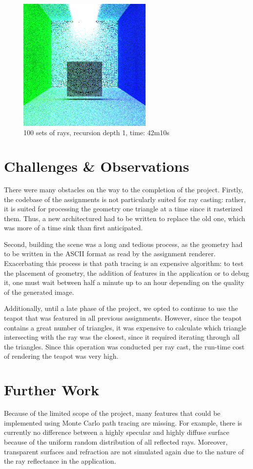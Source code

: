 \documentclass[12pt,journal]{IEEEtran}
\begin{document}
\begin{figure}[!t]

\centering
\includegraphics[width=2.6in]{100s_16d_42m10s}
\caption{100 sets of rays, recursion depth 1, time: 42m10s}
\label{1100s_16d_42m10s}

\end{figure}

\section{Challenges \& Observations}
There were many obstacles on the way to the completion of the project. Firstly, the codebase of the assignments is not particularly suited for ray casting: rather, it is suited for processing the geometry one triangle at a time since it rasterized them. Thus, a new architectured had to be written to replace the old one, which was more of a time sink than first anticipated. 
\par
Second, building the scene was a long and tedious process, as the geometry had to be written in the ASCII format as read by the assignment renderer. Exacerbating this process is that path tracing is an expensive algorithm: to test the placement of geometry, the addition of features in the application or to debug it, one must wait between half a minute up to an hour depending on the quality of the generated image.
\par
Additionally, until a late phase of the project, we opted to continue to use the teapot that was featured in all previous assignments. However, since the teapot contains a great number of triangles, it was  expensive to calculate which triangle intersecting with the ray was the closest, since it required iterating through all the triangles. Since this operation was conducted per ray cast, the run-time cost of rendering the teapot was very high.

\section{Further Work}
Because of the limited scope of the project, many features that could be implemented using Monte Carlo path tracing are missing. For example, there is currently no difference between a highly specular and highly diffuse surface because of the uniform random distribution of all reflected rays. Moreover, transparent surfaces and refraction are not simulated again due to the nature of the ray reflectance in the application.
\end{document}

